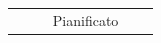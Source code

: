 \documentclass[a4paper,11pt]{article}
\begin{document}
\begin{longtable}{p{}p{}p{}p{}}
\begin{enumerate}
\end{enumerate} & Pianificato\\

\end{longtable}
\end{document}
